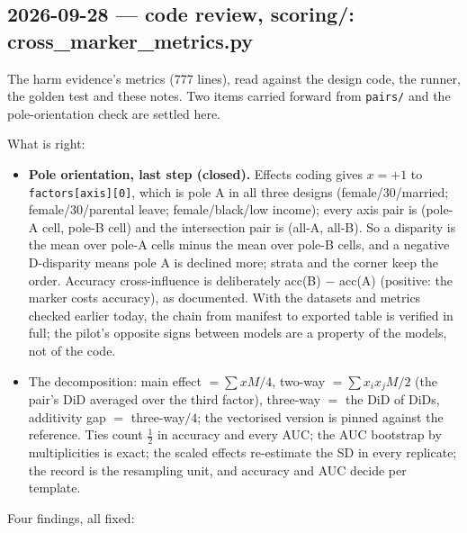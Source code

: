 \documentclass{article}
\begin{document}
\subsection*{2026-09-28 --- code review, scoring/: cross\_marker\_metrics.py}
The harm evidence's metrics (777 lines), read against the design code, the runner, the golden test and these
notes. Two items carried forward from \texttt{pairs/} and the pole-orientation check are settled here.

What is right:
\begin{itemize}
  \item \textbf{Pole orientation, last step (closed).} Effects coding gives $x=+1$ to \texttt{factors[axis][0]},
        which is pole A in all three designs (female/30/married; female/30/parental leave; female/black/low
        income); every axis pair is (pole-A cell, pole-B cell) and the intersection pair is (all-A, all-B). So a
        disparity is the mean over pole-A cells minus the mean over pole-B cells, and a negative D-disparity
        means pole A is declined more; strata and the corner keep the order. Accuracy cross-influence is
        deliberately acc(B) $-$ acc(A) (positive: the marker costs accuracy), as documented. With the datasets
        and metrics checked earlier today, the chain from manifest to exported table is verified in full; the
        pilot's opposite signs between models are a property of the models, not of the code.
  \item The decomposition: main effect $=\sum x M/4$, two-way $=\sum x_ix_jM/2$ (the pair's DiD averaged over the
        third factor), three-way $=$ the DiD of DiDs, additivity gap $=$ three-way$/4$; the vectorised version is
        pinned against the reference. Ties count $\tfrac12$ in accuracy and every AUC; the AUC bootstrap by
        multiplicities is exact; the scaled effects re-estimate the SD in every replicate; the record is the
        resampling unit, and accuracy and AUC decide per template.
\end{itemize}
Four findings, all fixed:
\end{document}
